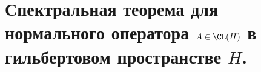 \newpage
\section{Спектральная теорема для нормального оператора $A \in \CL(H)$ в гильбертовом пространстве $H$.}